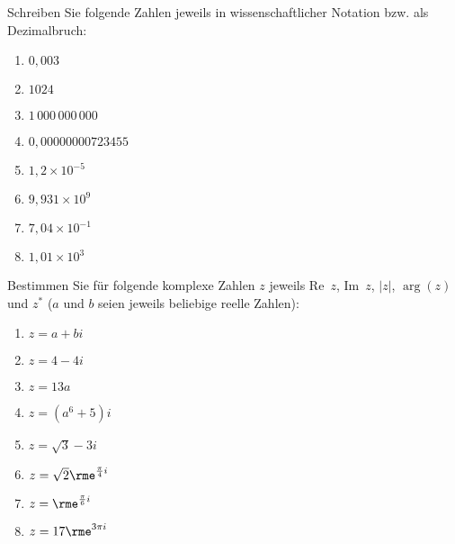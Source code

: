 Schreiben Sie folgende Zahlen jeweils in wissenschaftlicher Notation bzw. als Dezimalbruch:\\
\parbox{0.5\textwidth}{\begin{enumerate}
\item $0,003$
\item $1024$
\item $1\,000\,000\,000$
\item $0,00000000723455$
\end{enumerate}}\parbox{0.5\textwidth}{\begin{enumerate}\setcounter{enumi}{4}
\item $1,2\times 10^{-5}$
\item $9,931\times 10^9$
\item $7,04\times 10^{-1}$
\item $1,01\times 10^{3}$
\end{enumerate}}




Bestimmen Sie für folgende komplexe Zahlen $z$ jeweils Re~$z$, Im~$z$, $|z|$, $\arg(z)$ und $z^*$ ($a$ und $b$ seien jeweils beliebige reelle Zahlen):\\
\parbox{0.5\textwidth}{\begin{enumerate}
\item $z=a+bi$
\item $z=4-4i$
\item $z=13a$
\item $z=(a^6+5)i$
\end{enumerate}}\parbox{0.5\textwidth}{\begin{enumerate}\setcounter{enumi}{4}
\item $z=\sqrt{3}-3i$
\item $z=\sqrt{2}\rme^{\frac{\pi}{4}i}$
\item $z=\rme^{\frac{\pi}{6}i}$
\item $z=17\rme^{3\pi i}$
\end{enumerate}}




